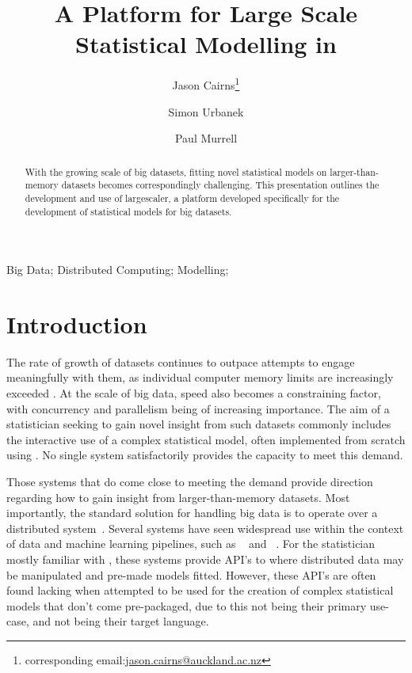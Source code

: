 \documentclass[letterpaper, inpress]{jds} %
\title{A Platform for Large Scale Statistical Modelling in \proglang{R}}
\author[1]{Jason Cairns\thanks{corresponding email:\href{mailto:jason.cairns@auckland.ac.nz}{jason.cairns@auckland.ac.nz}}}
\author[1]{Simon Urbanek}
\author[1]{Paul Murrell}
\affil[1]{Department of Statistics, University of Auckland, New Zealand}
\begin{document}
\maketitle

\begin{abstract}
With the growing scale of big datasets, fitting novel statistical models on larger-than-memory datasets becomes correspondingly challenging.
This presentation outlines the development and use of largescaler, a platform developed specifically for the development of statistical models for big datasets.
\end{abstract}
\begin{keywords} %
Big Data;
Distributed Computing;
Modelling;
\end{keywords}

\section{Introduction}%
\label{sec:intro}

The rate of growth of datasets continues to outpace attempts to engage meaningfully with them, as individual computer memory limits are increasingly exceeded \citep{kleppmann2017dataintensive}.
At the scale of big data, speed also becomes a constraining factor, with concurrency and parallelism being of increasing importance.
The aim of a statistician seeking to gain novel insight from such datasets commonly includes the interactive use of a complex statistical model, often implemented from scratch using .
No single system satisfactorily provides the capacity to meet this demand.

Those systems that do come close to meeting the demand provide direction regarding how to gain insight from larger-than-memory datasets.
Most importantly, the standard solution for handling big data is to operate over a distributed system~\citep{boja2012distributed}.
Several systems have seen widespread use within the context of data and machine learning pipelines, such as ~\citep{zaharia2016apache} and ~\citep{shvachko2010hadoop}.
For the statistician mostly familiar with , these systems provide API's to  where distributed data may be manipulated and pre-made models fitted.
However, these API's are often found lacking when attempted to be used for the creation of complex statistical models that don't come pre-packaged, due to this not being their primary use-case, and  not being their target language.
\end{document}
